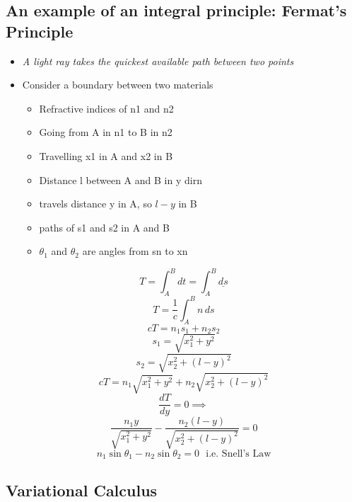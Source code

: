 \documentclass[a4paper,11pt,normalem]{article}
\begin{document}
\subsection{An example of an integral principle: Fermat's Principle}\label{an-example-of-an-integral-principle-fermats-principle}

\begin{itemize}
\item
  \emph{A light ray takes the quickest available path between two
  points}
\item
  Consider a boundary between two materials
  \begin{itemize}
  \item
    Refractive indices of n1 and n2
  \item
    Going from A in n1 to B in n2
  \item
    Travelling x1 in A and x2 in B
  \item
    Distance l between A and B in y dirn
  \item
    travels distance y in A, so \(l - y\) in B
  \item
    paths of s1 and s2 in A and B
  \item
    \(\theta_1\) and \(\theta_2\) are angles from sn to xn
  \end{itemize}
\end{itemize}

\[
    T = \int_{A}^{B} dt = \int_{A}^{B} \underline{ds} \] \[
    T = \frac{1}{c} \int_{A}^{B} n\,ds \] \[
    cT = n_1 s_1 + n_2 s_2 \] \[
    s_1 = \sqrt{x_{1}^{2} + y^2} \] \[
    s_2 = \sqrt{x_{2}^{2} + (l - y)^2} \] \[
    cT = n_{1}\sqrt{x_{1}^{2} + y^2} + n_{2}\sqrt{x_{2}^{2} + (l - y)^2} \]
\[
    \frac{dT}{dy} = 0 \implies \] \[
    \frac{n_1 y}{\sqrt{x_{1}^{2} + y^2}} - \frac{n_2 (l - y)}{\sqrt{x_{2}^{2} + (l - y)^2}} = 0 \]
\[
    n_{1}\sin\theta_1 - n_{2}\sin\theta_2 = 0 ~~~\text{i.e. Snell's Law}
\]

\subsection{Variational Calculus}\label{variational-calculus}
\end{document}
